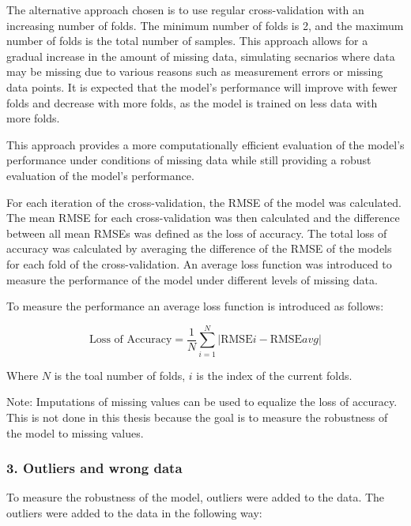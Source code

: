 The alternative approach chosen is to use regular cross-validation with an increasing
number of folds.
The minimum number of folds is 2, and the maximum number of folds is the total number of samples.
This approach allows for a gradual increase in the amount of missing data, simulating secnarios
where data may be missing due to various reasons such as measurement errors or missing data points.
It is expected that the
model's performance will improve with fewer folds and decrease with more folds, as the model is
trained on less data with more folds.

This approach provides a more computationally efficient
evaluation of the model's performance under conditions of missing data while still providing a
robust evaluation of the model's performance.

For each iteration of the cross-validation, the \ac{RMSE} of the model was
calculated.
The mean RMSE for each cross-validation was then calculated and the difference
between all mean RMSEs was defined as the loss of accuracy.
The total loss of accuracy was calculated by averaging the difference of the RMSE of the models
for each fold of the
cross-validation.
An average loss function was introduced to measure the performance of the model under different
levels of missing data.

To measure the performance an average loss function is introduced as follows:

\begin{tcolorbox}[arc=0pt,boxrule=0.5pt]
    \begin{equation}
        \label{eq:average_loss}
        \text{Loss of Accuracy} = \frac{1}{N} \sum_{i=1}^{N} |\text{RMSE}i - \text{RMSE}{avg}|
    \end{equation}
\end{tcolorbox}

Where $N$ is the toal number of folds, $i$ is the index of the current folds.

Note: Imputations of missing values can be used to equalize the loss of accuracy. This is not
done in this thesis because the goal is to measure the robustness of the model to missing values.

\subsubsection*{3. Outliers and wrong data}
To measure the robustness of the model, outliers were added to the data. The outliers were added
to the data in the following way:

